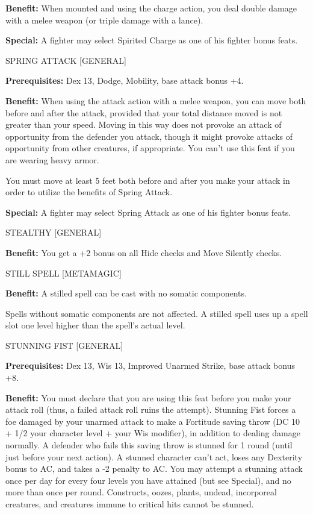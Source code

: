 \documentclass{article}
\begin{document}
\textbf{Benefit:} When mounted and using the charge action, you deal double damage 
with a melee weapon (or triple damage with a lance).

\textbf{Special:} A fighter may select Spirited Charge as one of his fighter bonus 
feats.

\vspace{12pt}
SPRING ATTACK [GENERAL]

\textbf{Prerequisites:} Dex 13, Dodge, Mobility, base attack bonus +4.

\textbf{Benefit:} When using the attack action with a melee weapon, you can move 
both before and after the attack, provided that your total distance moved is not 
greater than your speed. Moving in this way does not provoke an attack of opportunity 
from the defender you attack, though it might provoke attacks of opportunity from 
other creatures, if appropriate. You can't use this feat if you are wearing heavy 
armor.

You must move at least 5 feet both before and after you make your attack in order 
to utilize the benefits of Spring Attack.

\textbf{Special:} A fighter may select Spring Attack as one of his fighter bonus 
feats.

\vspace{12pt}
STEALTHY [GENERAL]

\textbf{Benefit:} You get a +2 bonus on all Hide checks and Move Silently checks.

\vspace{12pt}
STILL SPELL [METAMAGIC]

\textbf{Benefit:} A stilled spell can be cast with no somatic components.

Spells without somatic components are not affected. A stilled spell uses up a spell 
slot one level higher than the spell's actual level.

\vspace{12pt}
STUNNING FIST [GENERAL]

\textbf{Prerequisites:} Dex 13, Wis 13, Improved Unarmed Strike, base attack bonus 
+8.

\textbf{Benefit:} You must declare that you are using this feat before you make 
your attack roll (thus, a failed attack roll ruins the attempt). Stunning Fist 
forces a foe damaged by your unarmed attack to make a Fortitude saving throw (DC 
10 + 1/2 your character level + your Wis modifier), in addition to dealing damage 
normally. A defender who fails this saving throw is stunned for 1 round (until 
just before your next action). A stunned character can't act, loses any Dexterity 
bonus to AC, and takes a -2 penalty to AC. You may attempt a stunning attack once 
per day for every four levels you have attained (but see Special), and no more 
than once per round. Constructs, oozes, plants, undead, incorporeal creatures, 
and creatures immune to critical hits cannot be stunned.
\end{document}
